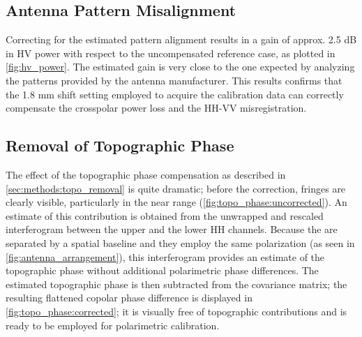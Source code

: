 \subsection{Antenna Pattern Misalignment}\label{sec:discussion:misalignment}
Correcting for the estimated pattern alignment results in a gain of approx. 2.5 dB  in HV power with respect to the uncompensated reference case, as plotted in \autoref{fig:hv_power}. The estimated gain is very close to the one expected by analyzing the patterns provided by the antenna manufacturer. This results confirms that the 1.8 mm shift setting employed to acquire the calibration data can correctly compensate the crosspolar power loss and the HH-VV misregistration.
\subsection{Removal of Topographic Phase}
The effect of the topographic phase compensation as described in \autoref{sec:methods:topo_removal} is quite dramatic;
before the correction, fringes are clearly visible, particularly in the near range (\autoref{fig:topo_phase:uncorrected}). An estimate of this contribution is obtained from the unwrapped and rescaled interferogram between the upper and the lower HH channels. Because the are separated by a spatial baseline and they employ the same polarization (as seen in \autoref{fig:antenna_arrangement}), this interferogram provides an estimate of the topographic phase without additional polarimetric phase differences. The estimated topographic phase is then subtracted from the covariance matrix; the resulting flattened copolar phase difference is displayed in \autoref{fig:topo_phase:corrected}; it is visually free of topographic contributions and is ready to be employed for polarimetric calibration.
